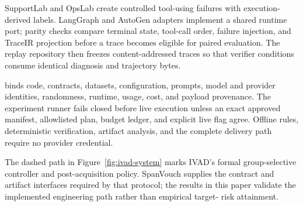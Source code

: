 SupportLab and OpsLab create controlled tool-using failures with execution-
derived labels. LangGraph and AutoGen adapters implement a shared runtime port;
parity checks compare terminal state, tool-call order, failure injection, and
TraceIR projection before a trace becomes eligible for paired evaluation. The
replay repository then freezes content-addressed traces so that verifier
conditions consume identical diagnosis and trajectory bytes.

 binds code, contracts, datasets, configuration,
prompts, model and provider identities, randomness, runtime, usage, cost, and
payload provenance. The experiment runner fails closed before live execution
unless an exact approved manifest, allowlisted plan, budget ledger, and explicit
live flag agree. Offline rules, deterministic verification, artifact analysis,
and the complete delivery path require no provider credential.

The dashed path in Figure~\ref{fig:ivad-system} marks IVAD's formal
group-selective controller and post-acquisition policy. SpanVouch supplies the
contract and artifact interfaces required by that protocol; the results in this
paper validate the implemented engineering path rather than empirical target-
risk attainment.
